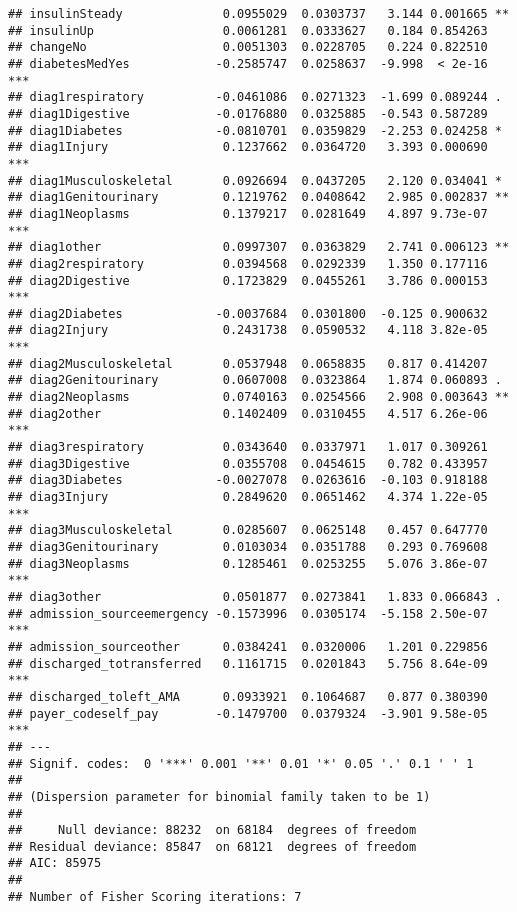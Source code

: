 \documentclass[]{article}
\begin{document}
\begin{verbatim}
## insulinSteady              0.0955029  0.0303737   3.144 0.001665 ** 
## insulinUp                  0.0061281  0.0333627   0.184 0.854263    
## changeNo                   0.0051303  0.0228705   0.224 0.822510    
## diabetesMedYes            -0.2585747  0.0258637  -9.998  < 2e-16 ***
## diag1respiratory          -0.0461086  0.0271323  -1.699 0.089244 .  
## diag1Digestive            -0.0176880  0.0325885  -0.543 0.587289    
## diag1Diabetes             -0.0810701  0.0359829  -2.253 0.024258 *  
## diag1Injury                0.1237662  0.0364720   3.393 0.000690 ***
## diag1Musculoskeletal       0.0926694  0.0437205   2.120 0.034041 *  
## diag1Genitourinary         0.1219762  0.0408642   2.985 0.002837 ** 
## diag1Neoplasms             0.1379217  0.0281649   4.897 9.73e-07 ***
## diag1other                 0.0997307  0.0363829   2.741 0.006123 ** 
## diag2respiratory           0.0394568  0.0292339   1.350 0.177116    
## diag2Digestive             0.1723829  0.0455261   3.786 0.000153 ***
## diag2Diabetes             -0.0037684  0.0301800  -0.125 0.900632    
## diag2Injury                0.2431738  0.0590532   4.118 3.82e-05 ***
## diag2Musculoskeletal       0.0537948  0.0658835   0.817 0.414207    
## diag2Genitourinary         0.0607008  0.0323864   1.874 0.060893 .  
## diag2Neoplasms             0.0740163  0.0254566   2.908 0.003643 ** 
## diag2other                 0.1402409  0.0310455   4.517 6.26e-06 ***
## diag3respiratory           0.0343640  0.0337971   1.017 0.309261    
## diag3Digestive             0.0355708  0.0454615   0.782 0.433957    
## diag3Diabetes             -0.0027078  0.0263616  -0.103 0.918188    
## diag3Injury                0.2849620  0.0651462   4.374 1.22e-05 ***
## diag3Musculoskeletal       0.0285607  0.0625148   0.457 0.647770    
## diag3Genitourinary         0.0103034  0.0351788   0.293 0.769608    
## diag3Neoplasms             0.1285461  0.0253255   5.076 3.86e-07 ***
## diag3other                 0.0501877  0.0273841   1.833 0.066843 .  
## admission_sourceemergency -0.1573996  0.0305174  -5.158 2.50e-07 ***
## admission_sourceother      0.0384241  0.0320006   1.201 0.229856    
## discharged_totransferred   0.1161715  0.0201843   5.756 8.64e-09 ***
## discharged_toleft_AMA      0.0933921  0.1064687   0.877 0.380390    
## payer_codeself_pay        -0.1479700  0.0379324  -3.901 9.58e-05 ***
## ---
## Signif. codes:  0 '***' 0.001 '**' 0.01 '*' 0.05 '.' 0.1 ' ' 1
## 
## (Dispersion parameter for binomial family taken to be 1)
## 
##     Null deviance: 88232  on 68184  degrees of freedom
## Residual deviance: 85847  on 68121  degrees of freedom
## AIC: 85975
## 
## Number of Fisher Scoring iterations: 7
\end{verbatim}
\end{document}
